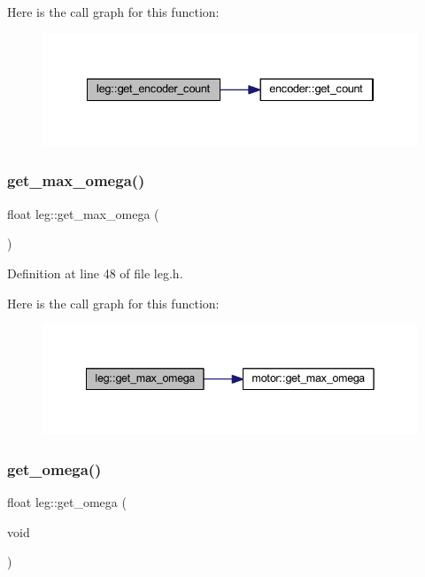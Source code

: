 Here is the call graph for this function\+:
\nopagebreak
\begin{figure}[H]
\begin{center}
\leavevmode
\includegraphics[width=334pt]{classleg_ab7d470db701c7745266338157b79e1d0_cgraph}
\end{center}
\end{figure}
\mbox{\label{classleg_ad3d8cc47a4bbed8c1781f86966b18207}} 
\subsubsection{\texorpdfstring{get\_max\_omega()}{get\_max\_omega()}}
{\footnotesize\ttfamily float leg\+::get\+\_\+max\+\_\+omega (\begin{DoxyParamCaption}{ }\end{DoxyParamCaption})\hspace{0.3cm}{\ttfamily [inline]}}



Definition at line 48 of file leg.\+h.

Here is the call graph for this function\+:
\nopagebreak
\begin{figure}[H]
\begin{center}
\leavevmode
\includegraphics[width=342pt]{classleg_ad3d8cc47a4bbed8c1781f86966b18207_cgraph}
\end{center}
\end{figure}
\mbox{\label{classleg_a90a92add134cc7f610202ae703ed8857}} 
\subsubsection{\texorpdfstring{get\_omega()}{get\_omega()}}
{\footnotesize\ttfamily float leg\+::get\+\_\+omega (\begin{DoxyParamCaption}\item[{void}]{ }\end{DoxyParamCaption})\hspace{0.3cm}{\ttfamily [inline]}}



